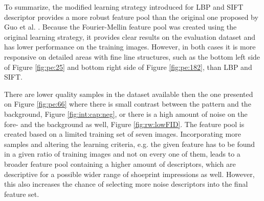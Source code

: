 \documentclass[draft,final]{vutinfth} %
\begin{document}
\par
To summarize, the modified learning strategy introduced for LBP and SIFT descriptor provides a more robust feature pool than the original one proposed by Guo et al. \cite{guo2012discriminative}.
Because the Fourier-Mellin feature pool was created using the original learning strategy, it provides clear results  on the evaluation dataset and has lower performance on the training images.
However, in both cases it is more responsive on detailed areas with fine line structures, such as the bottom left side of Figure \ref{fig:pe:25} and bottom right side of Figure \ref{fig:pe:182}, than LBP and SIFT.
\par
There are lower quality samples in the dataset available then the one presented on Figure  \ref{fig:pe:66} where there is small contrast between the pattern and the background, Figure  \ref{fig:int:cap:neg}, or there is a high amount of noise on the fore- and the background as well, Figure \ref{fig:rw:lowFID}.
The feature pool is created based on a limited training set of seven images.
Incorporating more samples and altering the learning criteria, e.g. the given feature has to be found in a given ratio of training images and not on every one of them, leads to a broader feature pool containing a higher amount of descriptors, which are descriptive for a possible wider range of shoeprint impressions as well.
However, this also increases the chance of selecting more noise descriptors into the final feature set.
\end{document}
